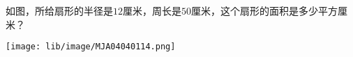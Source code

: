 如图，所给扇形的半径是$12$厘米，周长是$50$厘米，这个扇形的面积是多少平方厘米？

\begin{center}
    \texttt{[image: lib/image/MJA04040114.png]}
\end{center}